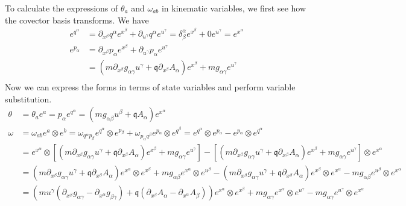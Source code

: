 To calculate the expressions of $\theta_a$ and $\omega_{ab}$ in kinematic variables, we first see how the covector basis transforms. We have
\begin{equation}
	\begin{aligned}
		e^{q^\alpha} &= \partial_{x^\beta} q^\alpha e^{x^\beta} + \partial_{u^\gamma} q^\alpha e^{u^\gamma} = \delta_{\beta}^{\alpha} e^{x^\beta} + 0 e^{u^\gamma} = e^{x^\alpha} \\
		e^{p_\alpha} &= \partial_{x^\beta}  p_\alpha e^{x^\beta} + \partial_{u^\gamma} p_\alpha e^{u^\gamma} \\
		&= \left(m \partial_{x^\beta} g_{\alpha\gamma} u^\gamma + \mathfrak{q} \partial_{x^\beta} A_\alpha \right)e^{x^\beta} + m g_{\alpha \gamma} e^{u^\gamma} \\
	\end{aligned}
\end{equation}
Now we can express the forms in terms of state variables and perform variable substitution. 
\begin{equation}
	\begin{aligned}
		\theta &= \theta_a e^a = p_\alpha e^{q^\alpha} = (m g_{\alpha \beta} u^\beta + \mathfrak{q} A_\alpha) e^{x^\alpha} \\
		\omega &= \omega_{ab}e^a \otimes e^b = \omega_{q^{\alpha} p_{\beta}}e^{q^\alpha} \otimes e^{p_\beta} + \omega_{p_{\alpha} q^{\beta}}e^{p_\alpha} \otimes e^{q^\beta} = e^{q^\alpha} \otimes e^{p_\alpha} - e^{p_\alpha} \otimes e^{q^\alpha} \\
		&=  e^{x^\alpha} \otimes \left[ \left(m \partial_{x^\beta} g_{\alpha\gamma} u^\gamma + \mathfrak{q} \partial_{x^\beta} A_\alpha \right)e^{x^\beta} + m g_{\alpha \gamma} e^{u^\gamma} \right] - \left[ \left(m \partial_{x^\beta} g_{\alpha\gamma} u^\gamma + \mathfrak{q} \partial_{x^\beta} A_\alpha \right)e^{x^\beta} + m g_{\alpha \gamma} e^{u^\gamma} \right] \otimes e^{x^\alpha}  \\
		&=  \left(m \partial_{x^\beta} g_{\alpha\gamma} u^\gamma + \mathfrak{q} \partial_{x^\beta} A_\alpha \right) e^{x^\alpha} \otimes e^{x^\beta} + m g_{\alpha \beta} e^{x^\alpha} \otimes e^{u^\beta} - \left(m \partial_{x^\beta} g_{\alpha\gamma} u^\gamma + \mathfrak{q} \partial_{x^\beta} A_\alpha \right)e^{x^\beta} \otimes e^{x^\alpha} - m g_{\alpha \beta} e^{u^\beta} \otimes e^{x^\alpha}  \\
		&= \left(m u^\gamma \left( \partial_{x^\beta} g_{\alpha\gamma} - \partial_{x^\alpha} g_{\beta\gamma}\right) + \mathfrak{q} \left( \partial_{x^\beta} A_\alpha - \partial_{x^\alpha} A_\beta\right) \right) e^{x^\alpha} \otimes e^{x^\beta} + m g_{\alpha \gamma} e^{x^\alpha} \otimes e^{u^\gamma} - m g_{\alpha \gamma} e^{u^\gamma} \otimes e^{x^\alpha} \\
	\end{aligned}
\end{equation}
